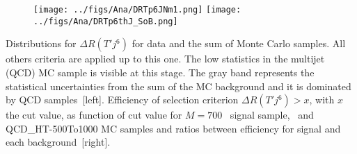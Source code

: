 \begin{frame}{}
\vspace{-.2cm}

\begin{figure}[!Hhtbp]
  \begin{center}
    \texttt{[image: ../figs/Ana/DRTp6JNm1.png]}
    \texttt{[image: ../figs/Ana/DRTp6thJ\_SoB.png]}
  \end{center}
\end{figure}

\vspace{-.5cm}
    \begin{block}{}
      \tiny \centering Distributions for $\Delta R (T' j^{6})$  for data and the sum of Monte Carlo samples. All others criteria are applied up to this one. The low statistics in the multijet (QCD) MC sample is visible at this stage. The gray band represents the statistical uncertainties from the sum of the MC background and it is dominated by QCD samples~[left]. Efficiency of selection criterion $\Delta R (T' j^{6})>x$, with $x$ the cut value, as function of cut value for $M=700$ \GeVcc~signal sample, \ttbar~and QCD\_HT-500To1000 MC samples and ratios between efficiency for signal and each background~[right].
    \end{block}

\end{frame}

